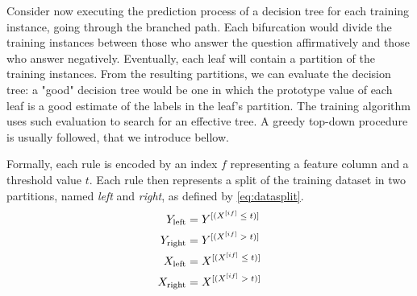 

Consider now executing the prediction process of a decision tree for each training instance, going through the branched path. Each bifurcation would divide the training instances between those who answer the question affirmatively and those who answer negatively. Eventually, each leaf will contain a partition of the training instances.
From the resulting partitions, we can evaluate the decision tree:
a "good" decision tree would be one in which the prototype value of each leaf is a good estimate of the labels in the leaf's partition.
%
The training algorithm uses such evaluation to search for an effective tree.
A greedy top-down procedure is usually followed, that we introduce bellow.

Formally, each rule is encoded by an index $f$ representing a feature column and a threshold value $t$. Each rule then represents a split of the training dataset in two partitions, named \emph{left} and \emph{right}, as defined by \autoref{eq:datasplit}.
%
\begin{equation}
    \begin{split} %
        Y_\text{left} &=Y\el{(X\el{if} \; \le \; t)} \\
        Y_\text{right} &=Y\el{(X\el{if} \; > \; t)} \\
        X_\text{left} &=X\el{(X\el{if} \; \le \; t)} \\
        X_\text{right} &=X\el{(X\el{if} \; > \; t)}
    \end{split}
    \label{eq:datasplit}
\end{equation}

